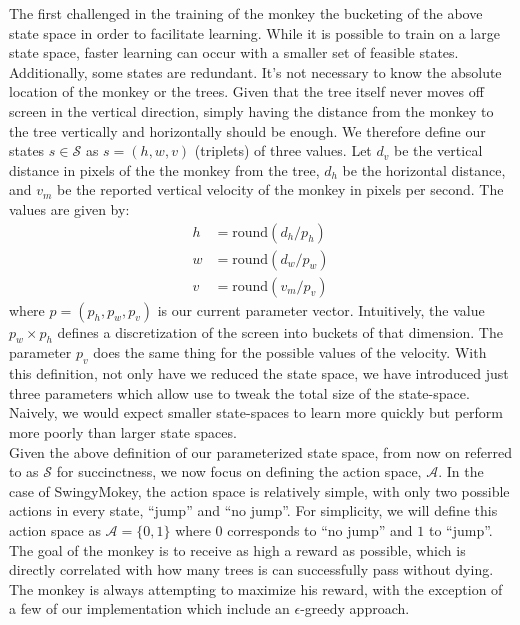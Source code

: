 \documentclass[letterpaper]{article}
\begin{document}
The first challenged in the training of the monkey the bucketing of the above state space in order to facilitate learning. While it is possible to train on a large state space, faster learning can occur with a smaller set of feasible states. Additionally, some states are redundant. It's not necessary to know the absolute location of the monkey or the trees. Given that the tree itself never moves off screen in the vertical direction, simply having the distance from the monkey to the tree vertically and horizontally should be enough. We therefore define our states $s \in \mathcal{S}$ as $s = (h,w,v)$ (triplets) of three values. Let $d_v$ be the vertical distance in pixels of the the monkey from the tree, $d_h$ be the horizontal distance, and $v_m$ be the reported vertical velocity of the monkey in pixels per second. The values are given by:
\begin{align}
h &= \text{round}(d_h/p_h) \\
w &= \text{round}(d_w/p_w) \\
v &= \text{round}(v_m/p_v)
\end{align}
where $p = (p_h,p_w,p_v)$ is our current parameter vector. Intuitively, the value $p_w \times p_h$ defines a discretization of the screen into buckets of that dimension. The parameter $p_v$ does the same thing for the possible values of the velocity. With this definition, not only have we reduced the state space, we have introduced just three parameters which allow use to tweak the total size of the state-space. Naively, we would expect smaller state-spaces to learn more quickly but perform more poorly than larger state spaces. \\

Given the above definition of our parameterized state space, from now on referred to as $\mathcal{S}$ for succinctness, we now focus on defining the action space, $\mathcal{A}$. In the case of SwingyMokey, the action space is relatively simple, with only two possible actions in every state, ``jump'' and ``no jump''. For simplicity, we will define this action space as $\mathcal{A} = \{0,1\}$ where $0$ corresponds to ``no jump'' and $1$ to ``jump''.\\

The goal of the monkey is to receive as high a reward as possible, which is directly correlated with how many trees is can successfully pass without dying. The monkey is always attempting to maximize his reward, with the exception of a few of our implementation which include an $\epsilon$-greedy approach.\\
\end{document}
